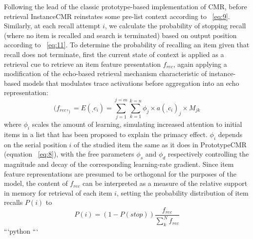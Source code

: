 {}\markdownRendererInterblockSeparator
{}Following the lead of the classic prototype-based implementation of CMR, before retrieval InstanceCMR reinstates some pre-list context according to ~\ref{eq:9}. Similarly, at each recall attempt $i$, we calculate the probability of stopping recall (where no item is recalled and search is terminated) based on output position according to ~\ref{eq:11}.\markdownRendererInterblockSeparator
{}To determine the probability of recalling an item given that recall does not terminate, first the current state of context is applied as a retrieval cue to retrieve an item feature presentation $f_{rec}$, again applying a modification of the echo-based retrieval mechanism characteristic of instance-based models that modulates trace activations before aggregation into an echo representation:\markdownRendererInterblockSeparator
{}\begin{equation} \label{eq:20} (f_{rec}, _) = E(_, c_i) = \sum^{j=m}_{j=1}\sum^{k=n}_{k=1} {\phi}_j \times a(_, c_i)_j \times M_{jk} \end{equation}\markdownRendererInterblockSeparator
{}where ${\phi}_i$ scales the amount of learning, simulating increased attention to initial items in a list that has been proposed to explain the primacy effect. ${\phi}_i$ depends on the serial position $i$ of the studied item the same as it does in PrototypeCMR (equation ~\ref{eq:8}), with the free parameters ${\phi}_s$ and ${\phi}_d$ respectively controlling the magnitude and decay of the corresponding learning-rate gradient.\markdownRendererInterblockSeparator
{}Since item feature representations are presumed to be orthogonal for the purposes of the model, the content of $f_{rec}$ can be interpreted as a measure of the relative support in memory for retrieval of each item $i$, setting the probability distribution of item recalls $P(i)$ to \markdownRendererInterblockSeparator
{}\begin{equation} \label{eq:21} P(i) = (1-P(stop))\frac{f_{rec}}{\sum_{k}^{N}f_{rec}} \end{equation}\markdownRendererInterblockSeparator
{}```python\markdownRendererInterblockSeparator
{}```\relax